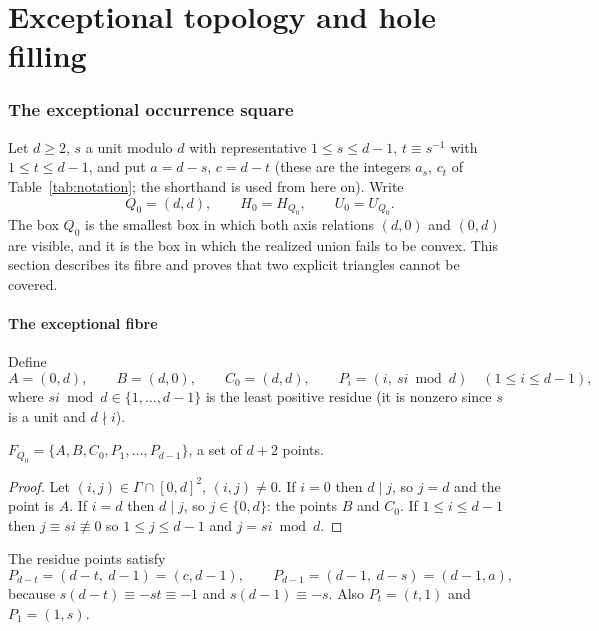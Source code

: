 \part{Exceptional topology and hole filling}

\section{The exceptional occurrence square}\label{sec:exceptional}

Let $d\ge2$, $s$ a unit modulo $d$ with representative $1\le s\le d-1$, $t\equiv s^{-1}$ with $1\le t\le d-1$, and put $a=d-s$, $c=d-t$ (these are the integers $a_s$, $c_t$ of Table~\ref{tab:notation}; the shorthand is used from here on). Write
\[
  Q_0=(d,d),\qquad H_0=H_{Q_0},\qquad U_0=U_{Q_0}.
\]
The box $Q_0$ is the smallest box in which both axis relations $(d,0)$ and $(0,d)$ are visible, and it is the box in which the realized union fails to be convex. This section describes its fibre and proves that two explicit triangles cannot be covered.

\subsection{The exceptional fibre}

Define
\[
  A=(0,d),\qquad B=(d,0),\qquad C_0=(d,d),\qquad P_i=(i,\ si\bmod d)\quad(1\le i\le d-1),
\]
where $si\bmod d\in\{1,\dots,d-1\}$ is the least positive residue (it is nonzero since $s$ is a unit and $d\nmid i$).

\begin{lemma}\label{lem:exc-fibre}
$F_{Q_0}=\{A,B,C_0,P_1,\dots,P_{d-1}\}$, a set of $d+2$ points.
\end{lemma}
\begin{proof}
Let $(i,j)\in\Gamma\cap[0,d]^2$, $(i,j)\ne0$. If $i=0$ then $d\mid j$, so $j=d$ and the point is $A$. If $i=d$ then $d\mid j$, so $j\in\{0,d\}$: the points $B$ and $C_0$. If $1\le i\le d-1$ then $j\equiv si\not\equiv0$ so $1\le j\le d-1$ and $j=si\bmod d$.
\end{proof}

The residue points satisfy
\begin{equation}\label{eq:special-P}
  P_{d-t}=(d-t,\ d-1)=(c,d-1),\qquad P_{d-1}=(d-1,\ d-s)=(d-1,a),
\end{equation}
because $s(d-t)\equiv-st\equiv-1$ and $s(d-1)\equiv-s$. Also $P_t=(t,1)$ and $P_1=(1,s)$.

